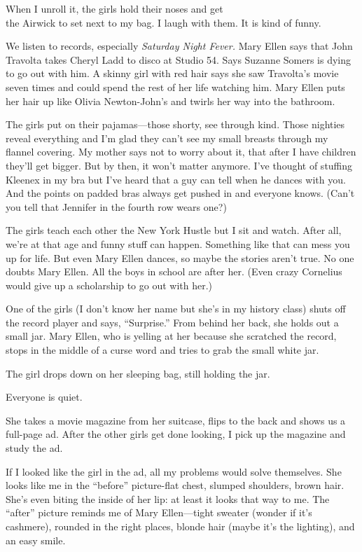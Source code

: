 \documentclass[twoside,10pt]{book}
\begin{document}
When I unroll it, the girls hold their noses and get\\
the Airwick to set next to my bag. I laugh with them. It is kind of
funny.

We listen to records, especially \emph{Saturday Night Fever.} Mary Ellen
says that John Travolta takes Cheryl Ladd to disco at Studio 54. Says
Suzanne Somers is dying to go out with him. A skinny girl with red hair
says she saw Travolta's movie seven times and could spend the rest of
her life watch­ing him. Mary Ellen puts her hair up like Olivia
Newton-John's and twirls her way into the bathroom.

The girls put on their pajamas---those shorty, see through kind. Those
nighties reveal everything and I'm glad they can't see my small breasts
through my flannel covering. My mother says not to worry about it, that
after I have children they'll get bigger. But by then, it won't matter
anymore. I've thought of stuffing Kleenex in my bra but I've heard that
a guy can tell when he dances with you. And the points on padded bras
always get pushed in and everyone knows. (Can't you tell that Jennifer
in the fourth row wears one?)

The girls teach each other the New York Hustle but I sit and watch.
After all, we're at that age and funny stuff can happen. Something like
that can mess you up for life. But even Mary Ellen dances, so maybe the
stories aren't true. No one doubts Mary Ellen. All the boys in school
are after her. (Even crazy Cornelius would give up a scholarship to go
out with her.)

One of the girls (I don't know her name but she's in my history class)
shuts off the record player and says, ``Surprise.'' From behind her
back, she holds out a small jar. Mary Ellen, who is yell­ing at her
because she scratched the record, stops in the middle of a curse word
and tries to grab the small white jar.

The girl drops down on her sleeping bag, still holding the jar.

Everyone is quiet.

She takes a movie magazine from her suitcase, flips to the back and
shows us a full-page ad. After the other girls get done looking, I pick
up the magazine and study the ad.

If I looked like the girl in the ad, all my problems would solve
themselves. She looks like me in the ``before'' picture-flat chest,
slumped shoulders, brown hair. She's even biting the inside of her lip:
at least it looks that way to me. The ``after'' picture reminds me of
Mary Ellen---tight sweater (wonder if it's cashmere), rounded in the
right places, blonde hair (maybe it's the lighting), and an easy smile.
\end{document}
